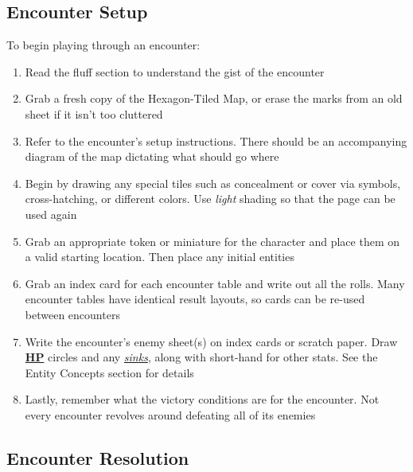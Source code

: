 \documentclass[12pt]{article}
\newcommand{\refto}[1]{\hyperlink{#1}{\textbf{#1}}}
\newcommand{\reftoit}[1]{\hyperlink{#1}{\emph{#1}}}
\begin{document}
\begin{multicols*}{2}
\vspace*{\fill}
\columnbreak

\subsection{Encounter Setup}
To begin playing through an encounter:
\begin{enumerate}
\item Read the fluff section to understand the gist of the encounter
\item Grab a fresh copy of the Hexagon-Tiled Map, or erase the marks from an old sheet if it isn’t too cluttered
\item Refer to the encounter’s setup instructions. There should be an accompanying diagram of the map dictating what should go where
\item Begin by drawing any special tiles such as concealment or cover via symbols, cross-hatching, or different colors. Use \emph{light} shading so that the page can be used again
\item Grab an appropriate token or miniature for the character and place them on a valid starting location. Then place any initial entities
\item Grab an index card for each encounter table and write out all the rolls. Many encounter tables have identical result layouts, so cards can be re-used between encounters
\item Write the encounter’s enemy sheet(s) on index cards or scratch paper. Draw \refto{HP} circles and any \reftoit{sinks}, along with short-hand for other stats. See the Entity Concepts section for details
\item Lastly, remember what the victory conditions are for the encounter. Not every encounter revolves around defeating all of its enemies
\end{enumerate}
\pagebreak

\subsection{Encounter Resolution}

\end{multicols*}
\end{document}
